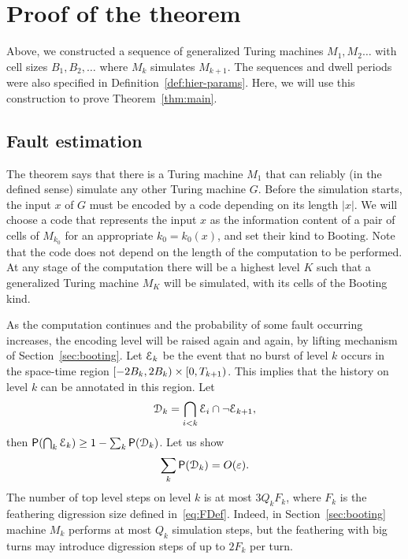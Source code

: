 \documentclass[11pt]{memoir}
\theoremstyle{definition} %
\renewcommand{\ge}{\geq}
\def\B{B}
\newcommand{\F}{F}
\def\G{G} %
\newcommand{\Q}{Q} %
\newcommand{\Tu}{T}
\newcommand{\Booting}{\mathrm{Booting}}
\begin{document}

\section{Proof of the theorem}\label{sec:computation}

Above, we constructed a sequence of generalized Turing machines \( M_{1},M_{2}\dots \)
with cell sizes \( \B_{1},\B_{2},\dots \) where \( M_{k} \) simulates \( M_{k+1} \).
The sequences and dwell periods were also specified in Definition~\ref{def:hier-params}.
Here, we will use this construction to prove Theorem~\ref{thm:main}.


\subsection{Fault estimation}\label{sec:fault-estimation}

The theorem says that there is a Turing machine \( M_{1} \) that can reliably (in the defined sense)
simulate any other Turing machine \( \G \).
Before the simulation starts, the input \( x \) of \( \G \) must be encoded by a code depending on
its length \( |x| \).
We will choose a code that represents the input \( x \) as the information content of a
pair of cells of \( M_{k_{0}} \) for an appropriate \( k_{0}=k_{0}(x) \), and set their kind to \( \Booting \).
Note that the code does not depend on the length of the computation to be performed.
At any stage of the computation there will be a highest level \( K \) such that a generalized Turing
machine \( M_{K} \) will be simulated, with its cells of the Booting kind.

As the computation continues and the probability of some fault occurring increases, the
encoding level will be raised again and again, by lifting mechanism of Section~\ref{sec:booting}.
Let \(  \mathcal{E}_{k}  \) be the event that no burst of level \( k \) occurs in the space-time region
\( \lint{-2\B_{k}}{2\B_{k}}\times\lint{0}{\Tu_{k+1}} \).
This implies that the history on level \( k \) can be annotated in this region.
Let
\begin{align*}
   \mathcal{D}_{k} = \bigcap_{i<k}\mathcal{E}_{i}\cap\neg \mathcal{E}_{k+1},
\end{align*}
then \( \Prob(\bigcap_{k}\cE_{k})\ge 1 -\sum_{k}\Prob(\cD_{k}) \).
Let us show
\begin{align}\label{eq:fault-estim-0}
 \sum_{k}\operatorname{\mathsf P}(\mathcal{D}_{k})  = O(\varepsilon).
\end{align}
The number of top level steps on level \( k \) is at most \( 3\Q_{k}\F_{k} \),
where \( \F_{k} \) is the feathering digression size defined in~\eqref{eq:FDef}.
Indeed, in Section~\ref{sec:booting} machine \( M_{k} \) performs at most \( \Q_{k} \) simulation
steps, but the feathering with big turns may introduce digression steps of up to \( 2\F_{k} \) per turn.
\end{document}
